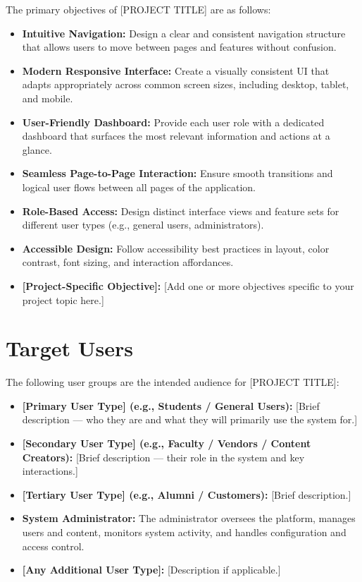 \documentclass[12pt, a4paper]{article}
\begin{document}
The primary objectives of [PROJECT TITLE] are as follows:

\begin{itemize}
    \item \textbf{Intuitive Navigation:} Design a clear and consistent navigation structure that allows users to move between pages and features without confusion.
    \item \textbf{Modern Responsive Interface:} Create a visually consistent UI that adapts appropriately across common screen sizes, including desktop, tablet, and mobile.
    \item \textbf{User-Friendly Dashboard:} Provide each user role with a dedicated dashboard that surfaces the most relevant information and actions at a glance.
    \item \textbf{Seamless Page-to-Page Interaction:} Ensure smooth transitions and logical user flows between all pages of the application.
    \item \textbf{Role-Based Access:} Design distinct interface views and feature sets for different user types (e.g., general users, administrators).
    \item \textbf{Accessible Design:} Follow accessibility best practices in layout, color contrast, font sizing, and interaction affordances.
    \item \textbf{[Project-Specific Objective]:} [Add one or more objectives specific to your project topic here.]
\end{itemize}

\section{Target Users}

The following user groups are the intended audience for [PROJECT TITLE]:

\begin{itemize}
    \item \textbf{[Primary User Type] (e.g., Students / General Users):} [Brief description --- who they are and what they will primarily use the system for.]
    \item \textbf{[Secondary User Type] (e.g., Faculty / Vendors / Content Creators):} [Brief description --- their role in the system and key interactions.]
    \item \textbf{[Tertiary User Type] (e.g., Alumni / Customers):} [Brief description.]
    \item \textbf{System Administrator:} The administrator oversees the platform, manages users and content, monitors system activity, and handles configuration and access control.
    \item \textbf{[Any Additional User Type]:} [Description if applicable.]
\end{itemize}
\end{document}

